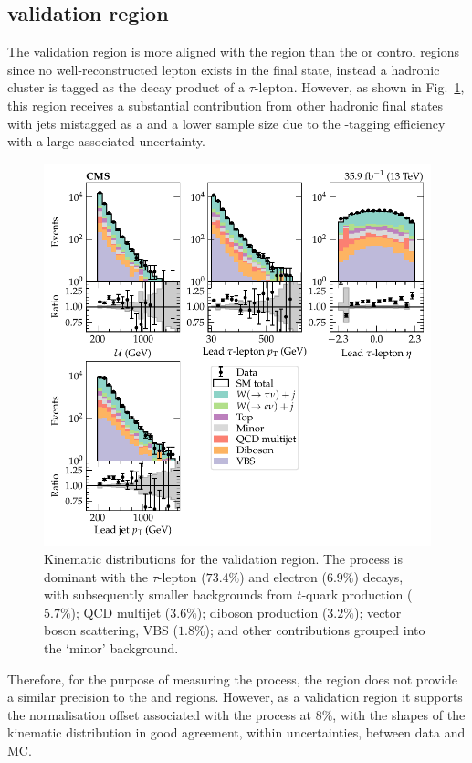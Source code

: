 \subsection{\tauplusjets validation region}

The \tauplusjets validation region is more aligned with the \metplusjets region than the \muplusjets or \eleplusjets control regions since no well-reconstructed lepton exists in the final state, instead a hadronic cluster is tagged as the decay product of a $\tau$-lepton. However, as shown in Fig.~\ref{fig:tauplusjets}, this region receives a substantial contribution from other hadronic final states with jets mistagged as a \Ptauh and a lower sample size due to the \Ptauh-tagging efficiency with a large associated uncertainty.
%
\begin{figure}[htb]
    \centering
    \includegraphics{chapters/042_backgrounds/images/singletau_dists.pdf}
    \caption[Single hadronic $\tau$-lepton final state kinematics.]{
        Kinematic distributions for the \tauplusjets validation region. The \IWj process is dominant with the $\tau$-lepton ($73.4\%$) and electron ($6.9\%$) decays, with subsequently smaller backgrounds from $t$-quark production ($5.7\%$); QCD multijet ($3.6\%$); diboson production ($3.2\%$); vector boson scattering, VBS ($1.8\%$); and other contributions grouped into the `minor' background.
    }
    \label{fig:tauplusjets}
\end{figure}
%
Therefore, for the purpose of measuring the \IWj process, the \tauplusjets region does not provide a similar precision to the \muplusjets and \eleplusjets regions. However, as a validation region it supports the normalisation offset associated with the \IWj process at $8\%$, with the shapes of the kinematic distribution in good agreement, within uncertainties, between data and MC.


